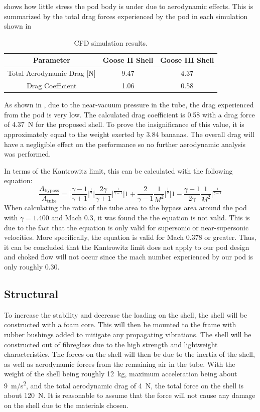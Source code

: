 \documentclass[main.tex]{subfiles}
\begin{document}
 shows how little stress the pod body is under due to aerodynamic effects. This is summarized by the total drag forces experienced by the pod in each simulation shown in 
\begin{table}[h!]
\centering
\begin{tabular}{c c c}
\hline
Parameter & Goose II Shell & Goose III Shell \\
\hline
Total Aerodynamic Drag [N] & 9.47 & 4.37\\
Drag Coefficient & 1.06 & 0.58\\
\hline
\end{tabular}
\caption{CFD simulation results.}
\label{table:aerotable2}
\end{table}
As shown in , due to the near-vacuum pressure in the tube, the drag experienced from the pod is very low. The calculated drag coefficient is 0.58 with a drag force of \SI{4.37}{N} for the proposed shell. To prove the insignificance of this value, it is approximately equal to the weight exerted by 3.84 bananas. The overall drag will have a negligible effect on the performance so no further aerodynamic analysis was performed.

In terms of the Kantrowitz limit, this can be calculated with the following equation:
\begin{equation}
\frac{A_{\textrm{bypass}}}{A_{\textrm{tube}}}=\bigg[\frac{\gamma - 1}{\gamma + 1}\bigg]^{\frac{1}{2}}\bigg[\frac{2\gamma}{\gamma + 1}\bigg]^{\frac{1}{\gamma - 1}}\bigg[1 + \frac{2}{\gamma - 1}\frac{1}{M^{2}}\bigg]^{\frac{1}{2}}\bigg[1 - \frac{\gamma - 1}{2\gamma}\frac{1}{M^{2}}\bigg]^{\frac{1}{\gamma - 1}}
\end{equation}
When calculating the ratio of the tube area to the bypass area around the pod with $\gamma= 1.400$ and Mach 0.3, it was found the the equation is not valid. This is due to the fact that the equation is only valid for supersonic or near-supersonic velocities. More specifically, the equation is valid for Mach 0.378 or greater. Thus, it can be concluded that the Kantrowitz limit does not apply to our pod design and choked flow will not occur since the mach number experienced by our pod is only roughly 0.30.\\

    \subsection{Structural}
To increase the stability and decrease the loading on the shell, the shell will be constructed with a foam core. This will then be mounted to the frame with rubber bushings added to mitigate any propagating vibrations. The shell will be constructed out of fibreglass due to the high strength and lightweight characteristics. The forces on the shell will then be due to the inertia of the shell, as well as aerodynamic forces from the remaining air in the tube. With the weight of the shell being roughly \SI{12}{kg}, maximum acceleration being about \SI{9}{m/s^2}, and the total aerodynamic drag of \SI{4}{N}, the total force on the shell is about \SI{120}{N}. It is reasonable to assume that the force will not cause any damage on the shell due to the materials chosen.
\end{document}

